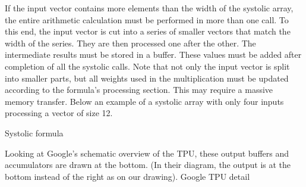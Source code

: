 If the input vector contains more elements than the width of the systolic array, the entire arithmetic calculation must be performed in more than one call. To this end, the input vector is cut into a series of smaller vectors that match the width of the series. They are then processed one after the other. The intermediate results must be stored in a buffer. These values must be added after completion of all the systolic calls.
Note that not only the input vector is split into smaller parts, but all weights used in the multiplication must be updated according to the formula's processing section. This may require a massive memory transfer. Below an example of a systolic array with only four inputs processing a vector of size 12.

Systolic formula

Looking at Google's schematic overview of the TPU, these output buffers and accumulators are drawn at the bottom. (In their diagram, the output is at the bottom instead of the right as on our drawing).  
Google TPU detail

